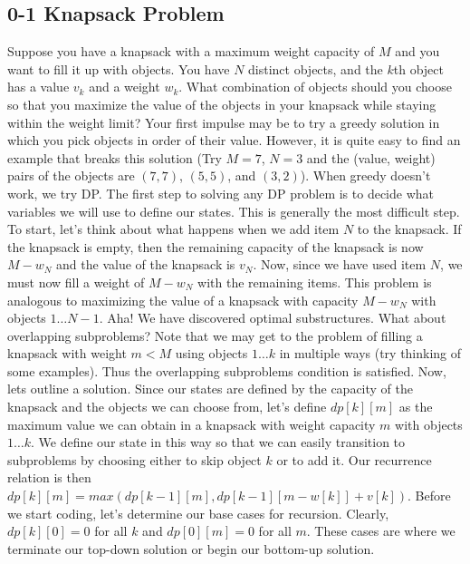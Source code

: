 \documentclass{article}
\newcommand{\nl}[]{\newline}
\begin{document}
\subsection{0-1 Knapsack Problem}
Suppose you have a knapsack with a maximum weight capacity of $M$ and you want to fill it up with objects. You have $N$ distinct objects, and the $k$th object has a value $v_k$ and a weight $w_k$. What combination of objects should you choose so that you maximize the value of the objects in your knapsack while staying within the weight limit?\nl\nl
Your first impulse may be to try a greedy solution in which you pick objects in order of their value. However, it is quite easy to find an example that breaks this solution (Try $M=7$, $N=3$ and the (value, weight) pairs of the objects are $(7, 7)$, $(5, 5)$, and $(3, 2)$). When greedy doesn't work, we try DP.\nl\nl
The first step to solving any DP problem is to decide what variables we will use to define our states. This is generally the most difficult step. To start, let's think about what happens when we add item $N$ to the knapsack. If the knapsack is empty, then the remaining capacity of the knapsack is now $M - w_N$ and the value of the knapsack is $v_N$. Now, since we have used item $N$, we must now fill a weight of $M - w_N$ with the remaining items. This problem is analogous to maximizing the value of a knapsack with capacity $M - w_N$ with objects $1\ldots N-1$. Aha! We have discovered optimal substructures.\nl\nl
What about overlapping subproblems? Note that we may get to the problem of filling a knapsack with weight $m < M$ using objects $1\ldots k$ in multiple ways (try thinking of some examples). Thus the overlapping subproblems condition is satisfied.\nl\nl
Now, lets outline a solution. Since our states are defined by the capacity of the knapsack and the objects we can choose from, let's define $dp[k][m]$ as the maximum value we can obtain in a knapsack with weight capacity $m$ with objects $1\ldots k$. We define our state in this way so that we can easily transition to subproblems by choosing either to skip object $k$ or to add it. Our recurrence relation is then $dp[k][m] = max(dp[k-1][m], dp[k-1][m-w[k]]+v[k])$. Before we start coding, let's determine our base cases for recursion. Clearly, $dp[k][0]=0$ for all $k$ and $dp[0][m]=0$ for all $m$. These cases are where we terminate our top-down solution or begin our bottom-up solution.
\end{document}

